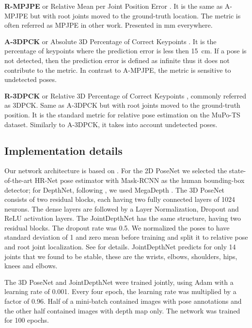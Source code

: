 \documentclass[runningheads]{llncs}
\begin{document}
\textbf{R-MPJPE} or Relative Mean per Joint Position Error \cite{h36m,veges2019depthpose}. It is the same as A-MPJPE but with root joints moved to the ground-truth location. The metric is often referred as MPJPE in other work. Presented in mm everywhere.

\textbf{A-3DPCK} or Absolute 3D Percentage of Correct Keypoints \cite{moon2019camdistance}. It is the percentage of keypoints where the prediction error is less then 15~cm. If a pose is not detected, then the prediction error is defined as infinite thus it does not contribute to the metric. In contrast to A-MPJPE, the metric is sensitive to undetected poses.

\textbf{R-3DPCK} or Relative 3D Percentage of Correct Keypoints \cite{mehta2018single_shot,moon2019camdistance}, commonly referred as 3DPCK. Same as A\nobreakdash-3DPCK but with root joints moved to the ground-truth position. It is the standard metric for relative pose estimation on the MuPo-TS dataset. Similarly to A\nobreakdash-3DPCK, it takes into account undetected poses.

\subsection{Implementation details}
Our network architecture is based on \cite{veges2019depthpose}. For the 2D PoseNet we selected the state-of-the-art HR-Net pose estimator \cite{hrnet} with Mask-RCNN \cite{maskrcnn} as the human bounding-box detector; for DepthNet, following \cite{veges2019depthpose}, we used MegaDepth \cite{megadepth2018}. The 3D PoseNet consists of two residual blocks, each having two fully connected layers of 1024 neurons. The dense layers are followed by a Layer Normalization, Dropout and ReLU activation layers. The JointDepthNet has the same structure, having two residual blocks. The dropout rate was 0.5. We normalized the poses to have standard deviation of 1 and zero mean before training and split it to relative pose and root joint localization. See \cite{veges2019depthpose} for details. JointDepthNet predicts  for only 14 joints  that we found to be stable, these are the wrists, elbows, shoulders, hips, knees and elbows.

The 3D PoseNet and JointDepthNet were trained jointly, using Adam with a learning rate of 0.001. Every four epoch, the learning rate was multiplied by a factor of 0.96. Half of a mini-batch contained images with pose annotations and the other half contained images with depth map only.
The network was trained for 100 epochs.
\end{document}
